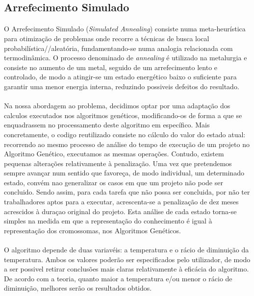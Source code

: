 \documentclass[a4paper]{article}
\begin{document}
\subsection{Arrefecimento Simulado}
\paragraph{}
O Arrefecimento Simulado (\textit{Simulated Annealing}) consiste numa meta-heurística para otimização de problemas onde recorre a técnicas de busca local probabilística//aleatória, fundamentando-se numa analogia relacionada com termodinâmica. O processo denominado de \textit{annealing} é utilizado na metalurgia e consiste no aumento de um metal, seguido de um arrefecimento lento e controlado, de modo a atingir-se um estado energético baixo o suficiente para garantir uma menor energia interna, reduzindo possiveis defeitos do resultado.
\paragraph{}
Na nossa abordagem ao problema, decidimos optar por uma adaptação dos calculos executados nos algoritmos genéticos, modificando-os de forma a que se enquadrassem no processamento deste algoritmo em específico. Mais concretamente, o codigo reutilizado consiste no cálculo do valor do estado atual: recorrendo ao mesmo processo de análise do tempo de execução de um projeto no Algoritmo Genético, executamos as mesmas operações. Contudo, existem pequenas alterações relativamente à penalização. Uma vez que pretendemos sempre avançar num sentido que favoreça, de modo individual, um determinado estado, convém nao generalizar os casos em que um projeto não pode ser concluido. Sendo assim, para cada tarefa que não possa ser concluida, por não ter trabalhadores aptos para a executar, acrescenta-se a penalização de dez meses acrescidos à duraçao original do projeto. Esta análise de cada estado torna-se simples na medida em que a representação do conhecimento é igual à representação dos cromossomas, nos Algoritmos Genéticos.
\paragraph{}
O algoritmo depende de duas variavéis: a temperatura e o rácio de diminuição da temperatura. Ambos os valores poderão ser especificados pelo utilizador, de modo a ser possivel retirar conclusões mais claras relativamente à eficácia do algoritmo. De acordo com a teoria, quanto maior a temperatura e/ou menor o rácio de diminuição, melhores serão os resultados obtidos.
\end{document}
